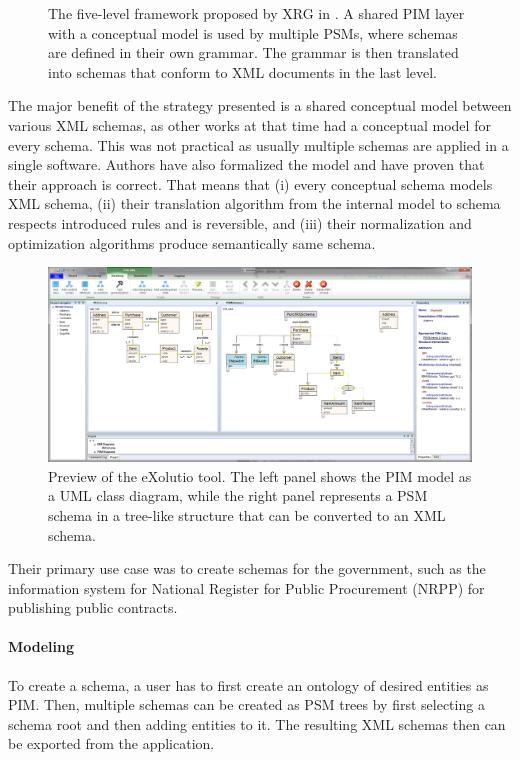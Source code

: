 \begin{figure}[h]
    \caption{The five-level framework proposed by XRG in \cite{necasky2012conceptual}. A shared PIM layer with a conceptual model is used by multiple PSMs, where schemas are defined in their own grammar. The grammar is then translated into schemas that conform to XML documents in the last level.}
\end{figure}

The major benefit of the strategy presented is a shared conceptual model between various XML schemas, as other works at that time had a conceptual model for every schema. This was not practical as usually multiple schemas are applied in a single software. Authors have also formalized the model and have proven that their approach is correct. That means that (i) every conceptual schema models XML schema, (ii) their translation algorithm from the internal model to schema respects introduced rules and is reversible, and (iii) their normalization and optimization algorithms produce semantically same schema.

\begin{figure}[h!]
    \centering
    \includegraphics[width=\textwidth]{img/exolutio.png}
    \caption{Preview of the eXolutio tool. The left panel shows the PIM model as a UML class diagram, while the right panel represents a PSM schema in a tree-like structure that can be converted to an XML schema.}
    \label{fig:exolutio}
\end{figure}

Their primary use case was to create schemas for the government, such as the information system for National Register for Public Procurement (NRPP) for publishing public contracts.

\paragraph{Modeling} To create a schema, a user has to first create an ontology of desired entities as PIM. Then, multiple schemas can be created as PSM trees by first selecting a schema root and then adding entities to it. The resulting XML schemas then can be exported from the application.

